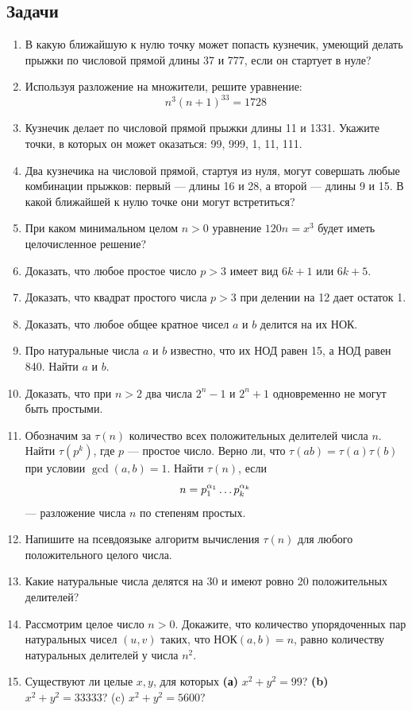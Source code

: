 \subsection*{Задачи}

\begin{enumerate}
\item В какую ближайшую к нулю точку может попасть кузнечик, умеющий делать прыжки по числовой прямой длины 37 и 777, если он стартует в нуле?
\item Используя разложение на множители, решите уравнение:
$$
n^3 (n + 1)^33 = 1728
$$
\item Кузнечик делает по числовой прямой прыжки длины 11 и 1331. Укажите точки, в которых он может оказаться: 99, 999, 1, 11, 111.
\item Два кузнечика на числовой прямой, стартуя из нуля, могут совершать любые комбинации прыжков: первый --- длины 16 и 28, а второй --- длины 9 и 15. В какой ближайшей к нулю точке они могут встретиться?
\item При каком минимальном целом $n > 0$ уравнение $120n = x^3$ будет иметь целочисленное решение?
\item Доказать, что любое простое число $p>3$ имеет вид $6k+1$ или $6k+5$.
\item Доказать, что квадрат простого числа $p>3$ при делении на 12 дает остаток 1.
\item Доказать, что любое общее кратное чисел $a$ и $b$ делится на их НОК.
\item Про натуральные числа $a$ и $b$ известно, что их НОД равен 15, а НОД равен 840. Найти $a$ и $b$.
\item Доказать, что при $n>2$ два числа $2^n-1$ и $2^n+1$ одновременно не могут быть простыми.
\item Обозначим за $\tau(n)$ количество всех положительных делителей числа $n$. Найти $\tau(p^k)$, где $p$ --- простое число. Верно ли, что $\tau(ab)=\tau(a)\tau(b)$ при условии $\gcd(a,b)=1$. Найти $\tau(n)$, если
$$
n=p_1^{\alpha_1}\dots p_k^{\alpha_k}
$$
--- разложение числа $n$ по степеням простых.
\item Напишите на псевдоязыке алгоритм вычисления $\tau(n)$ для любого положительного целого числа.

\item Какие натуральные числа делятся на 30 и имеют ровно 20 положительных делителей?
\item Рассмотрим целое число $n>0$. Докажите, что количество упорядоченных пар натуральных чисел $(u,v)$ таких, что НОК$(a,b)=n$, равно количеству натуральных делителей у числа $n^2$.
\item Существуют ли целые $x, y$, для которых \textbf{(а)} $x^2 + y^2 = 99$? \textbf{(b)}
$x^2 + y^2 = 33333$? (c) $x^2 + y^2 = 5600$?


\end{enumerate}
